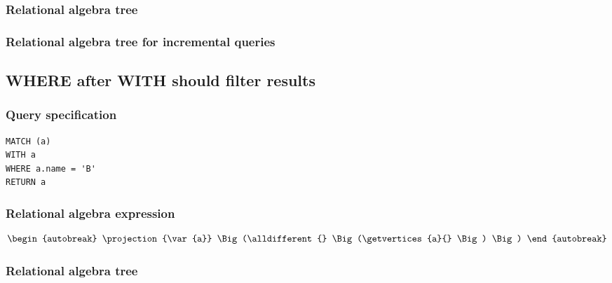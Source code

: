 \subsubsection*{Relational algebra tree}


\subsubsection*{Relational algebra tree for incremental queries}


\subsection{WHERE after WITH should filter results}

\subsubsection*{Query specification}

\begin{lstlisting}
MATCH (a)
WITH a
WHERE a.name = 'B'
RETURN a
\end{lstlisting}

\subsubsection*{Relational algebra expression}

\begin{align*}
\begin{autobreak}
\projection{\var{a}} \Big(\alldifferent{} \Big(\getvertices{a}{}
\Big)
\Big)
\end{autobreak}
\end{align*}

\subsubsection*{Relational algebra tree}


